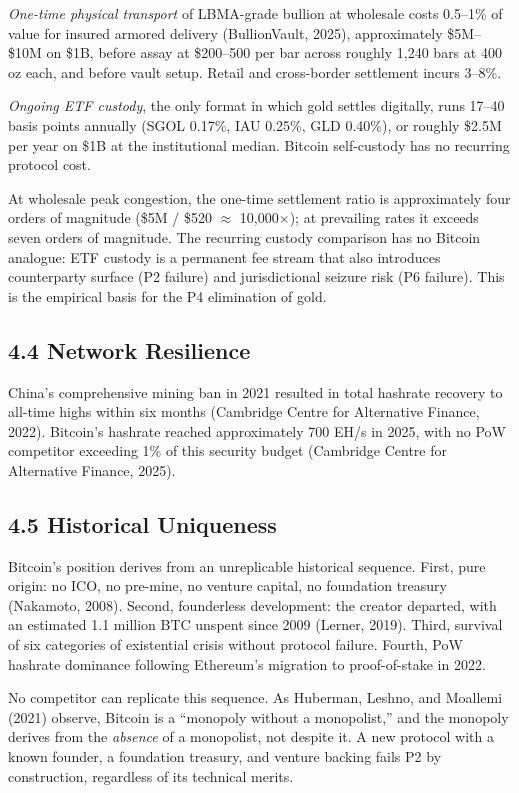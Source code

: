 \documentclass[12pt]{article}
\theoremstyle{definition}
\theoremstyle{remark}
\begin{document}
\noindent\emph{One-time physical transport} of LBMA-grade bullion at
wholesale costs 0.5--1\% of value for insured armored delivery
(BullionVault, 2025), approximately \$5M--\$10M on \$1B, before assay
at \$200--500 per bar across roughly 1,240 bars at 400 oz each, and
before vault setup. Retail and cross-border settlement incurs 3--8\%.

\noindent\emph{Ongoing ETF custody}, the only format in which gold
settles digitally, runs 17--40 basis points annually (SGOL 0.17\%, IAU
0.25\%, GLD 0.40\%), or roughly \$2.5M per year on \$1B at the
institutional median. Bitcoin self-custody has no recurring protocol
cost.

At wholesale peak congestion, the one-time settlement ratio is
approximately four orders of magnitude (\$5M / \$520 $\approx$
10,000$\times$); at prevailing rates it exceeds seven orders of
magnitude. The recurring custody comparison has no Bitcoin analogue:
ETF custody is a permanent fee stream that also introduces counterparty
surface (P2 failure) and jurisdictional seizure risk (P6 failure). This
is the empirical basis for the P4 elimination of gold.

\subsection{4.4 Network Resilience}

China's comprehensive mining ban in 2021 resulted in total hashrate
recovery to all-time highs within six months (Cambridge Centre for
Alternative Finance, 2022). Bitcoin's hashrate reached approximately
700 EH/s in 2025, with no PoW competitor exceeding 1\% of this security
budget (Cambridge Centre for Alternative Finance, 2025).

\subsection{4.5 Historical Uniqueness}

Bitcoin's position derives from an unreplicable historical sequence.
First, pure origin: no ICO, no pre-mine, no venture capital, no
foundation treasury (Nakamoto, 2008). Second, founderless development:
the creator departed, with an estimated 1.1 million BTC unspent since
2009 (Lerner, 2019). Third, survival of six categories of existential
crisis without protocol failure. Fourth, PoW hashrate dominance
following Ethereum's migration to proof-of-stake in 2022.

No competitor can replicate this sequence. As Huberman, Leshno, and
Moallemi (2021) observe, Bitcoin is a ``monopoly without a monopolist,''
and the monopoly derives from the \emph{absence} of a monopolist, not
despite it. A new protocol with a known founder, a foundation treasury,
and venture backing fails P2 by construction, regardless of its
technical merits.
\end{document}
